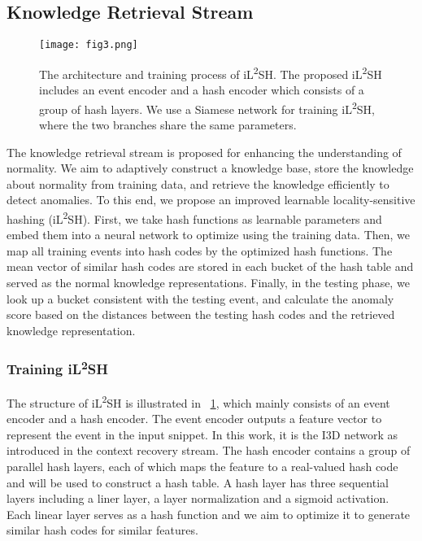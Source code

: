 \documentclass[lettersize,journal]{IEEEtran}
\begin{document}
\subsection{Knowledge Retrieval Stream}
\begin{figure}[!t]
	\centering
	\texttt{[image: fig3.png]}
	\caption{The architecture and training process of iL\textsuperscript{2}SH. The proposed iL\textsuperscript{2}SH includes an event encoder and a hash encoder which consists of a group of hash layers. We use a Siamese network for training iL\textsuperscript{2}SH, where the two branches share the same parameters.}
	\label{fig3}
\end{figure}
The knowledge retrieval stream is proposed for enhancing the understanding of normality.
We aim to adaptively construct a knowledge base, store the knowledge about normality from training data, and retrieve the knowledge efficiently to detect anomalies.
To this end, we propose an improved learnable locality-sensitive hashing (iL\textsuperscript{2}SH).
First, we take hash functions as learnable parameters and embed them into a neural network to optimize using the training data.
Then, we map all training events into hash codes by the optimized hash functions.
The mean vector of similar hash codes are stored in each bucket of the hash table and served as the normal knowledge representations.
Finally, in the testing phase, we look up a bucket consistent with the testing event, and calculate the anomaly score based on the distances between the testing hash codes and the retrieved knowledge representation.

\subsubsection{Training iL\textsuperscript{2}SH}
The structure of iL\textsuperscript{2}SH is illustrated in \figurename~\ref{fig3}, which mainly consists of an event encoder and a hash encoder.
The event encoder outputs a feature vector to represent the event in the input snippet.
In this work, it is the I3D network as introduced in the context recovery stream.
The hash encoder contains a group of parallel hash layers, each of which maps the feature to a real-valued hash code and will be used to construct a hash table.
A hash layer has three sequential layers including a liner layer, a layer normalization \cite{LayerNormalization2016ba} and a sigmoid activation.
Each linear layer serves as a hash function and we aim to optimize it to generate similar hash codes for similar features.
\end{document}
